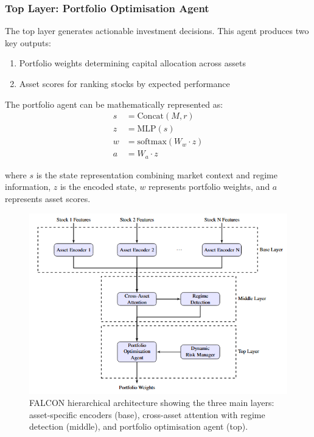 \documentclass[conference]{IEEEtran}
\begin{document}
\subsubsection{Top Layer: Portfolio Optimisation Agent}
The top layer generates actionable investment decisions. This agent produces two key outputs:
\begin{enumerate}
\item Portfolio weights determining capital allocation across assets
\item Asset scores for ranking stocks by expected performance
\end{enumerate}

The portfolio agent can be mathematically represented as:
\begin{align}
s &= \text{Concat}(M,r) \\
z &= \text{MLP}(s) \\
w &= \text{softmax}(W_w \cdot z) \\
a &= W_a \cdot z
\end{align}

where $s$ is the state representation combining market context and regime information, $z$ is the encoded state, $w$ represents portfolio weights, and $a$ represents asset scores.

\begin{figure}[htbp]
\centerline{\includegraphics[width=\columnwidth]{falcon_architecture.png}}
\caption{FALCON hierarchical architecture showing the three main layers: asset-specific encoders (base), cross-asset attention with regime detection (middle), and portfolio optimisation agent (top).}
\label{fig_architecture}
\end{figure}
\end{document}
